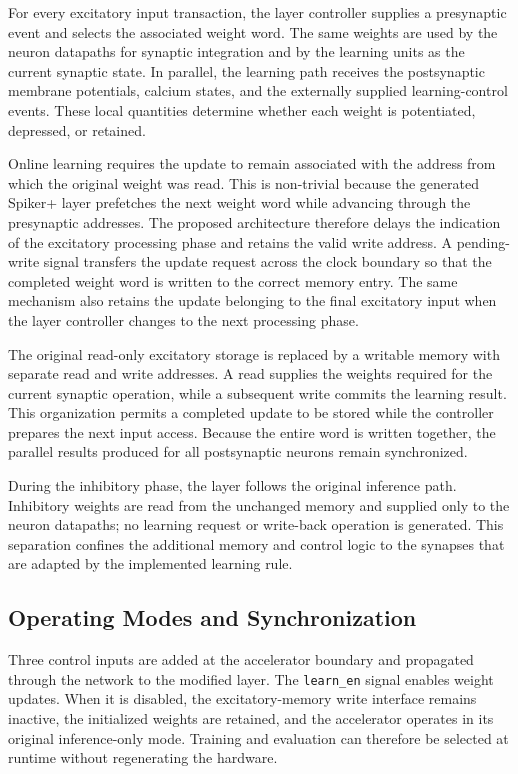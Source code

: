 For every excitatory input transaction, the layer controller supplies a presynaptic event and selects the associated weight word. The same weights are used by the neuron datapaths for synaptic integration and by the learning units as the current synaptic state. In parallel, the learning path receives the postsynaptic membrane potentials, calcium states, and the externally supplied learning-control events. These local quantities determine whether each weight is potentiated, depressed, or retained.

Online learning requires the update to remain associated with the address from which the original weight was read. This is non-trivial because the generated Spiker+ layer prefetches the next weight word while advancing through the presynaptic addresses. The proposed architecture therefore delays the indication of the excitatory processing phase and retains the valid write address. A pending-write signal transfers the update request across the clock boundary so that the completed weight word is written to the correct memory entry. The same mechanism also retains the update belonging to the final excitatory input when the layer controller changes to the next processing phase.

The original read-only excitatory storage is replaced by a writable memory with separate read and write addresses. A read supplies the weights required for the current synaptic operation, while a subsequent write commits the learning result. This organization permits a completed update to be stored while the controller prepares the next input access. Because the entire word is written together, the parallel results produced for all postsynaptic neurons remain synchronized.

During the inhibitory phase, the layer follows the original inference path. Inhibitory weights are read from the unchanged memory and supplied only to the neuron datapaths; no learning request or write-back operation is generated. This separation confines the additional memory and control logic to the synapses that are adapted by the implemented learning rule.

\subsection{Operating Modes and Synchronization}

Three control inputs are added at the accelerator boundary and propagated through the network to the modified layer. The \texttt{learn\_en} signal enables weight updates. When it is disabled, the excitatory-memory write interface remains inactive, the initialized weights are retained, and the accelerator operates in its original inference-only mode. Training and evaluation can therefore be selected at runtime without regenerating the hardware.

